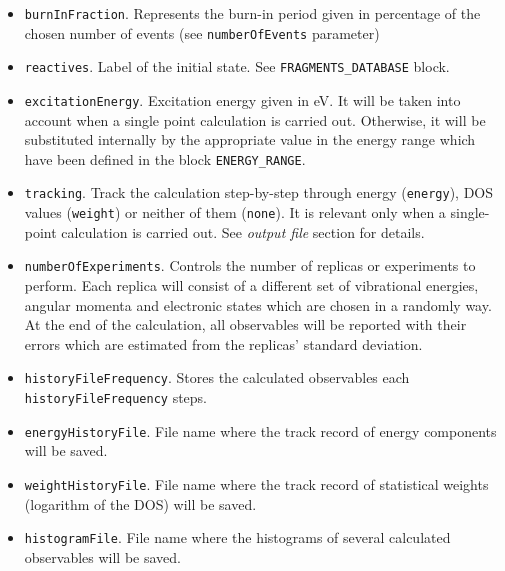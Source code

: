 \documentclass[a4paper,12pt]{article}
\begin{document}
\begin{itemize}
\begin{itemize}
\item \texttt{burnInFraction}. Represents the burn-in period given in percentage of the chosen number of events (see 
\texttt{numberOfEvents} parameter)
\item \texttt{reactives}. Label of the initial state. See \texttt{FRAGMENTS\_DATABASE} block.
\item \texttt{excitationEnergy}. Excitation energy given in eV.
It will be taken into account when a single point calculation is carried out. Otherwise, it will be 
substituted internally by the appropriate value in the energy range 
which have been defined in the block \texttt{ENERGY\_RANGE}.
\item \texttt{tracking}. Track the calculation step-by-step through energy (\texttt{energy}), DOS values 
(\texttt{weight}) or neither of them (\texttt{none}). It is relevant only when a single-point calculation is carried 
out. See \textit{output file} section for details.
\item \texttt{numberOfExperiments}. Controls the number of replicas or experiments to perform. Each replica will 
consist of a different set of vibrational energies, angular momenta and electronic states which are chosen in a 
randomly way. At the end of the calculation, all observables will be reported with their errors which are estimated from 
the replicas' standard deviation.
\item \texttt{historyFileFrequency}. Stores the calculated observables each \texttt{historyFileFrequency} steps.
\item \texttt{energyHistoryFile}. File name where the track record of energy components will be saved.
\item \texttt{weightHistoryFile}. File name where the track record of statistical weights (logarithm of 
the DOS) will be saved.
\item \texttt{histogramFile}. File name where the histograms of several calculated observables will be saved.
\end{itemize}


\end{itemize}
\end{document}
